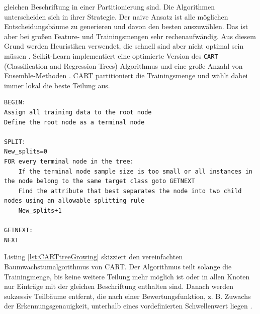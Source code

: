 gleichen Beschriftung in einer Partitionierung sind. Die Algorithmen unterscheiden sich in ihrer Strategie. Der naive Ansatz ist alle möglichen Entscheidungsbäume zu generieren und davon den besten auszuwählen.
Das ist aber bei großen Feature- und Trainingsmengen sehr rechenaufwändig. Aus diesem Grund werden Heuristiken verwendet, die schnell sind aber nicht optimal sein müssen \cite{quinlan1986induction}.
\newline
\newline
Scikit-Learn implementiert eine optimierte Version des \texttt{CART} (Classification and Regression Trees) Algorithmus \cite{ScikitLearnCART}
und eine große Anzahl von Ensemble-Methoden \cite{scikit-learn}. CART partitioniert die Trainingsmenge und wählt dabei immer lokal die beste Teilung aus.
\begin{lstlisting}[label=lst:CARTtreeGrowing,caption={Skizze von vereinfachten Baumwachstumsalgorithmus \cite{steinbergCART}.}]
BEGIN:
Assign all training data to the root node
Define the root node as a terminal node

SPLIT:
New_splits=0
FOR every terminal node in the tree:
    If the terminal node sample size is too small or all instances in the node belong to the same target class goto GETNEXT
    Find the attribute that best separates the node into two child nodes using an allowable splitting rule
    New_splits+1

GETNEXT:
NEXT
\end{lstlisting}
Listing \ref{lst:CARTtreeGrowing} skizziert den vereinfachten Baumwachstumalgorithmus von CART. Der Algorithmus teilt solange die Trainingmenge, bis keine weitere Teilung mehr möglich ist oder in allen Knoten nur
Einträge mit der gleichen Beschriftung enthalten sind. Danach werden sukzessiv Teilbäume entfernt, die nach einer Bewertungsfunktion, z. B. Zuwachs der Erkennungsgenauigkeit, unterhalb eines vordefinierten
Schwellenwert liegen \cite{steinbergCART}.